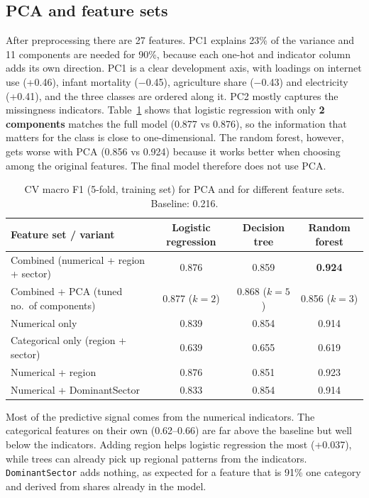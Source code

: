 \documentclass[10pt]{article}
\begin{document}
\subsection{PCA and feature sets}

After preprocessing there are 27 features. PC1 explains 23\% of the variance and 11 components are needed for
90\%, because each one-hot and indicator column adds its own direction. PC1 is a clear development axis, with
loadings on internet use (+0.46), infant mortality ($-$0.45), agriculture share ($-$0.43) and electricity (+0.41),
and the three classes are ordered along it. PC2 mostly captures the missingness indicators. Table~\ref{tab:abl}
shows that logistic regression with only \textbf{2 components} matches the full model (0.877 vs 0.876), so the
information that matters for the class is close to one-dimensional. The random forest, however, gets worse with
PCA (0.856 vs 0.924) because it works better when choosing among the original features. The final model
therefore does not use PCA.

\begin{table}[h]
\centering\small
\begin{tabular}{lccc}
\toprule
Feature set / variant & Logistic regression & Decision tree & Random forest \\
\midrule
Combined (numerical + region + sector) & 0.876 & 0.859 & \textbf{0.924} \\
Combined + PCA (tuned no.\ of components) & 0.877 ($k=2$) & 0.868 ($k=5$) & 0.856 ($k=3$) \\
Numerical only & 0.839 & 0.854 & 0.914 \\
Categorical only (region + sector) & 0.639 & 0.655 & 0.619 \\
Numerical + region & 0.876 & 0.851 & 0.923 \\
Numerical + DominantSector & 0.833 & 0.854 & 0.914 \\
\bottomrule
\end{tabular}
\caption{CV macro F1 (5-fold, training set) for PCA and for different feature sets. Baseline: 0.216.}
\label{tab:abl}
\end{table}

Most of the predictive signal comes from the numerical indicators. The categorical features on their own
(0.62--0.66) are far above the baseline but well below the indicators. Adding region helps logistic regression
the most (+0.037), while trees can already pick up regional patterns from the indicators. \texttt{DominantSector}
adds nothing, as expected for a feature that is 91\% one category and derived from shares already in the model.
\end{document}
